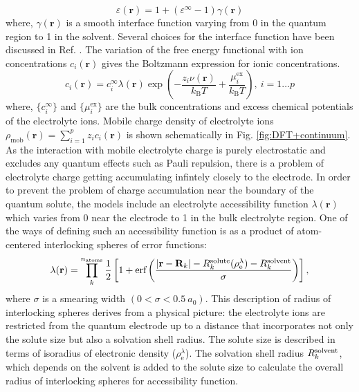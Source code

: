 \documentclass[journal=jacsat,manuscript=article]{achemso}
\newcommand{\bvec}[1]{\mathbf{#1}}
\newcommand*{\rvec}{\bvec{r}}
\newcommand*{\ofrvec}{\!\left(\rvec\right)}
\newcommand*{\dens}{\rho}
\newcommand*{\denselec}{\dens_{\textrm{e}}}
\newcommand*{\densmob}{\dens_{\textrm{mob}}}
\newcommand*{\ci}{c_i}
\newcommand*{\cif}{c_i^{\infty}}
\newcommand*{\acc}{\lambda}
\newcommand*{\zi}{z_i}
\newcommand*{\pot}{\nu}
\newcommand*{\eps}{\varepsilon}
\newcommand*{\kb}{k_{\textrm{B}}}
\newcommand*{\half}{\frac{1}{2}}
\newcommand*{\muexi}{\mu_i^\textrm{ex}}
\begin{document}
\begin{equation}
    \eps\ofrvec=1+\left(\eps^\infty-1\right)\gamma\ofrvec
\end{equation}
where, $\gamma\ofrvec$ is a smooth interface function varying from 0 in the quantum region to 1 in the solvent. Several choices for the interface function have been discussed in Ref. . The variation of the free energy functional with ion concentrations $\ci\ofrvec$ gives the Boltzmann expression for ionic concentrations.
\begin{equation}
\label{eq:cig}
    \ci\ofrvec = \cif\lambda(\rvec) \exp \left(-\frac{z_i\pot(\rvec)}{\kb T} +\frac{\muexi}{\kb T} \right), \ i=1\dots{}p
\end{equation}
where, $\{\cif\}$ and $\{\muexi\}$ are the bulk concentrations and excess chemical potentials of the electrolyte ions. Mobile charge density of electrolyte ions $\densmob\ofrvec=\sum\limits_{i=1}^p\zi\ci\ofrvec$ is shown schematically in Fig. \ref{fig:DFT+continuum}. As the interaction with mobile electrolyte charge is purely electrostatic and excludes any quantum effects such as Pauli repulsion, there is a problem of electrolyte charge getting accumulating infintely closely to the electrode. In order to prevent the problem of charge accumulation near the boundary of the quantum solute, the models include an electrolyte accessibility function $\acc\ofrvec$ which varies from 0 near the electrode to 1 in the bulk electrolyte region.\cite{Fisicaro2017, Sundararaman2018, Stein2019} One of the ways of defining such an accessibility function is as a product of atom-centered interlocking spheres of error functions:\cite{Dziedzic2020}
\begin{equation}
\label{eq:access}
    \acc\ofrvec = \prod\limits_{k}^{n_\textrm{atoms}}\half  \left[1+\textrm{erf}\left(\frac{|\textbf{r}-\textbf{R}_k|-R^{\rm solute}_k(\denselec^\acc)-R^{\rm solvent}_k}{\sigma}\right)\right],
\end{equation}
where $\sigma$ is a smearing width $(0<\sigma<0.5~a_0)$. This description of radius of interlocking spheres derives from a physical picture: the electrolyte ions are restricted from the quantum electrode up to a distance that incorporates not only the solute size but also a solvation shell radius. The solute size is described in terms of isoradius of electronic density ($\denselec^\acc$). The solvation shell radius $R^{\rm solvent}_k$, which depends on the solvent is added to the solute size to calculate the overall radius of interlocking spheres for accessibility function.
\end{document}
